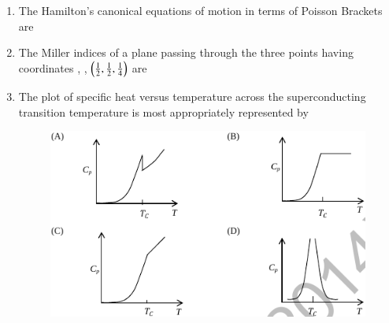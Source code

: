 \documentclass[journal,12pt,onecolumn]{IEEEtran}
\theoremstyle{remark}
\begin{document}
\begin{enumerate}
\item The Hamilton's canonical equations of motion in terms of Poisson Brackets are
\hfill{} \begin{enumerate}  \end{enumerate}

\item The Miller indices of a plane passing through the three points having coordinates , , $\left(\frac{1}{2}, \frac{1}{2}, \frac{1}{4}\right)$ are
\hfill{} \begin{enumerate}  \end{enumerate}

\item The plot of specific heat versus temperature across the superconducting transition temperature  is most appropriately represented by \\
\hfill{}
\begin{figure}[H]
\centering
 \caption*{} \label{30o} \includegraphics[width=0.8\columnwidth]{figs/q30.png}
\end{figure}


\end{enumerate}
\end{document}

